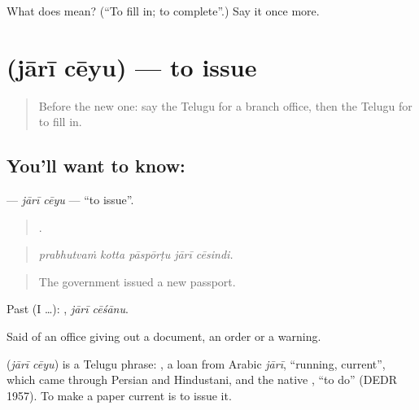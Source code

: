 \begin{tcolorbox}[breakable,colback=teal!4,colframe=teal!35!black,title={Before you move on}]
What does  mean? (\textquotedblleft{}To fill in; to complete\textquotedblright{}.) Say it once more.
\end{tcolorbox}
\section[\texorpdfstring{\te{జారీ} \te{చేయు} (jārī cēyu)}{జారీ చేయు (jārī cēyu)}]{  (jārī cēyu) — to issue}

\label{lesson:TE-C462-jari-ceyu}



\begin{quote}
Before the new one: say the Telugu for a branch office, then the Telugu for to fill in.
\end{quote}

\subsection*{You'll want to know:  }
\textbf{ } — \emph{jārī cēyu} — \textquotedblleft{}to issue\textquotedblright{}.

\begin{quote}
    .
\end{quote}

\begin{quote}
\emph{prabhutvaṁ kotta pāspōrṭu jārī cēsindi.}
\end{quote}

\begin{quote}
The government issued a new passport.
\end{quote}

Past (I …):  , \emph{jārī cēśānu}.

Said of an office giving out a document, an order or a warning.

\begin{cousinweb}
\textbf{ } (\emph{jārī cēyu}) is a Telugu phrase: , a loan from Arabic \emph{jārī}, \textquotedblleft{}running, current\textquotedblright{}, which came through Persian and Hindustani, and the native , \textquotedblleft{}to do\textquotedblright{} (DEDR 1957). To make a paper current is to issue it.
\end{cousinweb}

